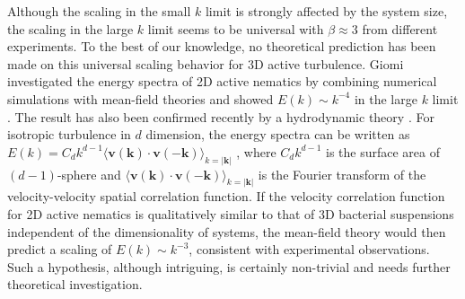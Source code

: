 \documentclass[twocolumn,aps,prx,amsmath,amssymb,longbibliography,superscriptaddress]{revtex4-2}
\begin{document}
Although the scaling in the small $k$ limit is strongly affected by the system size, the scaling in the large $k$ limit seems to be universal with $\beta \approx 3$ from different experiments. To the best of our knowledge, no theoretical prediction has been made on this universal scaling behavior for 3D active turbulence. Giomi investigated the energy spectra of 2D active nematics by combining numerical simulations with mean-field theories and showed $E(k) \sim k^{-4}$ in the large $k$ limit \cite{Giomi2015}.
The result has also been confirmed recently by a hydrodynamic theory \cite{Alert2020}. For isotropic turbulence in $d$ dimension, the energy spectra can be written as $E(k) = C_d k^{d-1} \langle \mathbf{v}(\mathbf{k})\cdot \mathbf{v}(-\mathbf{k})\rangle_{k = |\mathbf{k}|}$ \cite{Wensink2012,Bardfalvy2019},
where $C_d k^{d-1}$ is the surface area of $(d-1)$-sphere and $\langle \mathbf{v}(\mathbf{k})\cdot \mathbf{v}(-\mathbf{k})\rangle_{k = |\mathbf{k}|}$ is the Fourier transform of the velocity-velocity spatial correlation function. If the velocity correlation function for 2D active nematics is qualitatively similar to that of 3D bacterial suspensions independent of the dimensionality of systems, the mean-field theory would then predict a scaling of $E(k) \sim k^{-3}$, consistent with experimental observations. Such a hypothesis, although intriguing, is certainly non-trivial and needs further theoretical investigation.
\end{document}

